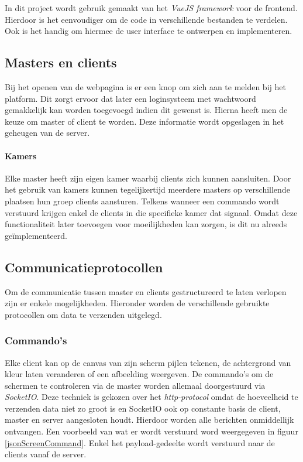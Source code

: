 In dit project wordt gebruik gemaakt van het \textit{VueJS framework} voor de frontend. Hierdoor is het eenvoudiger om de code in verschillende bestanden te verdelen. Ook is het handig om hiermee de user interface te ontwerpen en implementeren. 


\subsection{Masters en clients}
Bij het openen van de webpagina is er een knop om zich aan te melden bij het platform.
Dit zorgt ervoor dat later een loginsysteem met wachtwoord gemakkelijk kan worden toegevoegd indien dit gewenst is.
Hierna heeft men de keuze om master of client te worden. Deze informatie wordt opgeslagen in het geheugen van de server. 

\paragraph{Kamers} Elke master heeft zijn eigen kamer waarbij clients zich kunnen aansluiten. Door het gebruik van kamers kunnen tegelijkertijd meerdere masters op verschillende plaatsen hun groep clients aansturen.  Telkens wanneer een commando wordt verstuurd krijgen enkel de clients in die specifieke kamer dat signaal. Omdat deze functionaliteit later toevoegen voor moeilijkheden kan zorgen, is dit nu alreeds geïmplementeerd.

\subsection{Communicatieprotocollen}
Om de communicatie tussen master en clients gestructureerd te laten verlopen zijn er enkele mogelijkheden.
Hieronder worden de verschillende gebruikte protocollen om data te verzenden uitgelegd.
\subsubsection{Commando's}
Elke client kan op de canvas van zijn scherm pijlen tekenen, de achtergrond van kleur laten veranderen of een afbeelding weergeven. De commando's om de schermen te controleren via de master worden allemaal doorgestuurd via \textit{SocketIO}. Deze techniek is gekozen over het \textit{http-protocol} omdat de hoeveelheid te verzenden data niet zo groot is en SocketIO ook op constante basis de client, master en server aangesloten houdt. Hierdoor worden alle berichten onmiddellijk ontvangen. Een voorbeeld van wat er wordt verstuurd word weergegeven in figuur \ref{jsonScreenCommand}.
Enkel het payload-gedeelte wordt verstuurd naar de clients vanaf de server.

